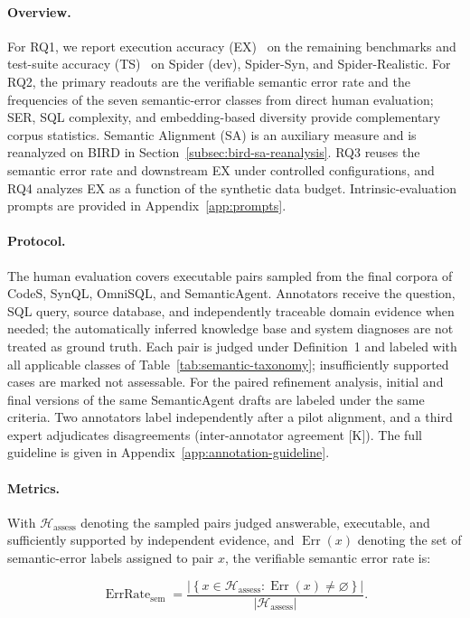 \documentclass[letterpaper,journal]{IEEEtran}
\begin{document}
\paragraph{Overview.}
For RQ1, we report execution accuracy (EX)~\cite{yu2018spider,li2023can} on the remaining benchmarks and test-suite accuracy (TS)~\cite{zhong2020semantic} on Spider (dev), Spider-Syn, and Spider-Realistic. For RQ2, the primary readouts are the verifiable semantic error rate and the frequencies of the seven semantic-error classes from direct human evaluation; SER, SQL complexity, and embedding-based diversity provide complementary corpus statistics. Semantic Alignment (SA) is an auxiliary measure and is reanalyzed on BIRD in Section~\ref{subsec:bird-sa-reanalysis}. RQ3 reuses the semantic error rate and downstream EX under controlled configurations, and RQ4 analyzes EX as a function of the synthetic data budget. Intrinsic-evaluation prompts are provided in Appendix~\ref{app:prompts}.

\paragraph{Protocol.}
The human evaluation covers executable pairs sampled from the final corpora of CodeS, SynQL, OmniSQL, and SemanticAgent. Annotators receive the question, SQL query, source database, and independently traceable domain evidence when needed; the automatically inferred knowledge base and system diagnoses are not treated as ground truth. Each pair is judged under Definition~1 and labeled with all applicable classes of Table~\ref{tab:semantic-taxonomy}; insufficiently supported cases are marked not assessable. For the paired refinement analysis, initial and final versions of the same SemanticAgent drafts are labeled under the same criteria. Two annotators label independently after a pilot alignment, and a third expert adjudicates disagreements (inter-annotator agreement [K]). The full guideline is given in Appendix~\ref{app:annotation-guideline}.

\paragraph{Metrics.}
With $\mathcal{H}_{\mathrm{assess}}$ denoting the sampled pairs judged answerable, executable, and sufficiently supported by independent evidence, and $\operatorname{Err}(x)$ denoting the set of semantic-error labels assigned to pair $x$, the verifiable semantic error rate is:

\begin{equation}
\label{eq:verifiable-semantic-error-rate}
\operatorname{ErrRate}_{\mathrm{sem}} = \frac{\left|\left\{x\in\mathcal{H}_{\mathrm{assess}} : \operatorname{Err}(x)\neq\varnothing\right\}\right|}{\left|\mathcal{H}_{\mathrm{assess}}\right|}.
\end{equation}
\end{document}
